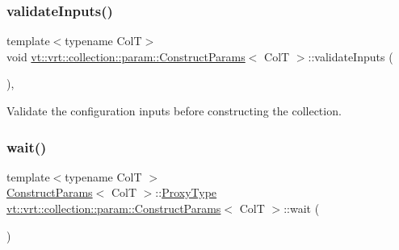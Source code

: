 \mbox{\label{structvt_1_1vrt_1_1collection_1_1param_1_1_construct_params_a6290541ab30870daf78af1984ddc164d}} 
\subsubsection{\texorpdfstring{validate\+Inputs()}{validateInputs()}}
{\footnotesize\ttfamily template$<$typename ColT$>$ \\
void \hyperlink{structvt_1_1vrt_1_1collection_1_1param_1_1_construct_params}{vt\+::vrt\+::collection\+::param\+::\+Construct\+Params}$<$ ColT $>$\+::validate\+Inputs (\begin{DoxyParamCaption}{ }\end{DoxyParamCaption})\hspace{0.3cm}{\ttfamily [inline]}, {\ttfamily [private]}}



Validate the configuration inputs before constructing the collection. 

\mbox{\label{structvt_1_1vrt_1_1collection_1_1param_1_1_construct_params_adc5b2150526c86cb3ce556f7cd865a0c}} 
\subsubsection{\texorpdfstring{wait()}{wait()}}
{\footnotesize\ttfamily template$<$typename ColT $>$ \\
\hyperlink{structvt_1_1vrt_1_1collection_1_1param_1_1_construct_params}{Construct\+Params}$<$ ColT $>$\+::\hyperlink{structvt_1_1vrt_1_1collection_1_1param_1_1_construct_params_a837fb2b2a036f898fb65da72d3ee2fb0}{Proxy\+Type} \hyperlink{structvt_1_1vrt_1_1collection_1_1param_1_1_construct_params}{vt\+::vrt\+::collection\+::param\+::\+Construct\+Params}$<$ ColT $>$\+::wait (\begin{DoxyParamCaption}{ }\end{DoxyParamCaption})}




